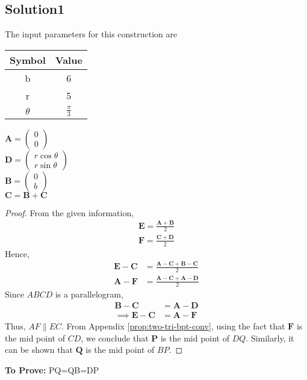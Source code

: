 \documentclass[10pt, a4paper]{article}
\newcommand{\myvec}[1]{\ensuremath{\begin{pmatrix}#1\end{pmatrix}}}
\let\vec\mathbf
\begin{document}
\begin{center}
   \section{Solution1}

The input parameters for this construction are 
\begin{center}
\begin{tabular}{|c|c|}
	\hline
	\textbf{Symbol}&\textbf{Value}\\
	\hline
	b&6\\
	\hline
	r&5\\
	\hline
	$\theta$&$\frac{\pi}{3}$\\
	\hline
\end{tabular}
\begin{center}
$\vec{A}=\myvec{0\\0}$\\
$\vec{D}=\myvec{r\cos\theta \\ r\sin\theta}$\\
$\vec{B}=\myvec{0\\b}$\\
$\vec{C} = \vec{B}+\vec{C}$\\
\fi
\begin{proof}
From the given information,
	\begin{align}
		\vec{E}=\frac{\vec{A}+\vec{B}}{2}\\
\vec{F}=\frac{\vec{C}+\vec{D}}{2}
	\end{align}
	Hence, 
	\begin{align}
		\vec{E}-\vec{C}&=\frac{\vec{A}-\vec{C}+\vec{B}-\vec{C}}{2}\\
		\vec{A}-\vec{F}&=\frac{\vec{A}-\vec{C}+\vec{A}-\vec{D}}{2}
	\end{align}
	Since $ABCD$ is a parallelogram,
	\begin{align}
		\vec{B}-\vec{C} &= 
	\vec{A}-\vec{D}
	\\
	\implies 
		\vec{E}-\vec{C} &=
\vec{A}-\vec{F}
	\end{align}
	Thus, $AF \parallel EC$.  From Appendix
	  \ref{prop:two-tri-bpt-conv},  using the fact that $\vec{F}$ is the mid point of $CD$, we conclude that $\vec{P}$ is the mid point of $DQ$.  Similarly, it can be shown that $\vec{Q}$ is the mid point of $BP$.
\end{proof}
\iffalse
\end{center}
\end{center}
\textbf{To Prove:} PQ=QB=DP

\end{center}
\end{document}
